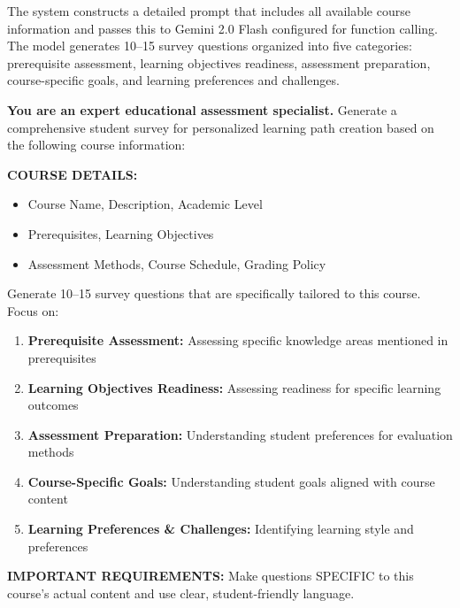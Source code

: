 \documentclass{stylefiles/capstone}
\begin{document}
The system constructs a detailed prompt that includes all available course information and passes this to Gemini 2.0 Flash configured for function calling. The model generates 10--15 survey questions organized into five categories: prerequisite assessment, learning objectives readiness, assessment preparation, course-specific goals, and learning preferences and challenges.

\begin{tcolorbox}[breakable, colframe=customcolor, colback=customcolor!30!white, coltitle=black, title=Survey Generation Prompt, fontupper=\small]
\textbf{You are an expert educational assessment specialist.} Generate a comprehensive student survey for personalized learning path creation based on the following course information:

\vspace{0.5em}
\textbf{COURSE DETAILS:}
\begin{itemize}
    \item Course Name, Description, Academic Level
    \item Prerequisites, Learning Objectives
    \item Assessment Methods, Course Schedule, Grading Policy
\end{itemize}

\vspace{0.5em}
Generate 10--15 survey questions that are specifically tailored to this course. Focus on:

\begin{enumerate}
    \item \textbf{Prerequisite Assessment:} Assessing specific knowledge areas mentioned in prerequisites
    \item \textbf{Learning Objectives Readiness:} Assessing readiness for specific learning outcomes
    \item \textbf{Assessment Preparation:} Understanding student preferences for evaluation methods
    \item \textbf{Course-Specific Goals:} Understanding student goals aligned with course content
    \item \textbf{Learning Preferences \& Challenges:} Identifying learning style and preferences
\end{enumerate}

\vspace{0.5em}
\textbf{IMPORTANT REQUIREMENTS:} Make questions SPECIFIC to this course's actual content and use clear, student-friendly language.
\end{tcolorbox}
\end{document}
